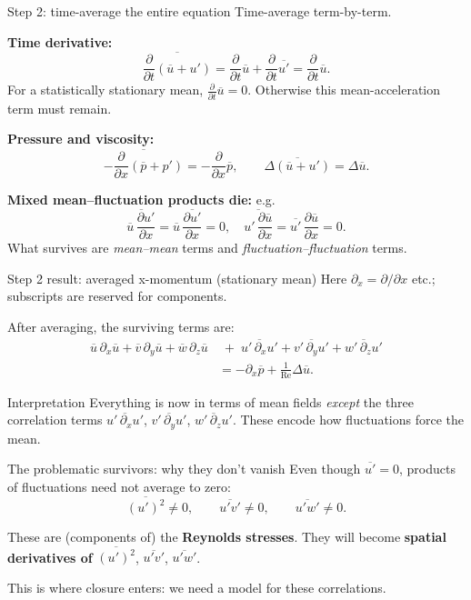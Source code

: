 \documentclass[aspectratio=169,11pt]{beamer}
\newcommand{\Rey}{\mathrm{Re}}
\newcommand{\avg}[1]{\overline{#1}}
\newcommand{\Lap}{\Delta}
\begin{document}
\begin{frame}{Step 2: time-average the entire equation}
Time-average term-by-term.

\textbf{Time derivative:}
\[
\avg{\frac{\partial}{\partial t}(\avg{u}+u')}
=
\frac{\partial}{\partial t} \avg{u} + \frac{\partial}{\partial t}\avg{u'}
=
\frac{\partial}{\partial t} \avg{u}.
\]
For a statistically stationary mean, $\frac{\partial}{\partial t}\avg{u}=0$. Otherwise this mean-acceleration term must remain.

\textbf{Pressure and viscosity:}
\[
\avg{-\frac{\partial}{\partial x}(\avg{p}+p')}=-\frac{\partial}{\partial x}\avg{p},\qquad
\avg{\Lap(\avg{u}+u')}=\Lap\avg{u}.
\]

\textbf{Mixed mean--fluctuation products die:} e.g.
\[
\avg{\avg{u}\,\frac{\partial u'}{\partial x}}=\avg{u}\,\avg{\frac{\partial u'}{\partial x}}=0,\quad
\avg{u'\,\frac{\partial \avg{u}}{\partial x}}=\avg{u'}\,\frac{\partial \avg{u}}{\partial x}=0.
\]
What survives are \emph{mean--mean} terms and \emph{fluctuation--fluctuation} terms.
\end{frame}

\begin{frame}{Step 2 result: averaged x-momentum (stationary mean)}
Here $\partial_x = \partial/\partial x$ etc.; subscripts are reserved for components.

After averaging, the surviving terms are:
\begin{align*}
\avg{u}\,\partial_x\avg{u}
+\avg{v}\,\partial_y\avg{u}
+\avg{w}\,\partial_z\avg{u}
&\;+\;\avg{u'\,\partial_x u'}
+\avg{v'\,\partial_y u'}
+\avg{w'\,\partial_z u'} \\
&= -\partial_x\avg{p} + \frac{1}{\Rey}\Lap \avg{u}.
\end{align*}

\begin{block}{Interpretation}
Everything is now in terms of mean fields \emph{except} the three correlation terms
$\avg{u'\,\partial_x u'}$, $\avg{v'\,\partial_y u'}$, $\avg{w'\,\partial_z u'}$.
These encode how fluctuations force the mean.
\end{block}
\end{frame}

\begin{frame}{The problematic survivors: why they don't vanish}
Even though $\avg{u'}=0$, products of fluctuations need not average to zero:
\[
\avg{(u')^2}\neq 0,\qquad \avg{u'v'}\neq 0,\qquad \avg{u'w'}\neq 0.
\]

These are (components of) the \textbf{Reynolds stresses}.
They will become \textbf{spatial derivatives of} $\avg{(u')^2}$, $\avg{u'v'}$, $\avg{u'w'}$.

This is where closure enters: we need a model for these correlations.
\end{frame}
\end{document}
